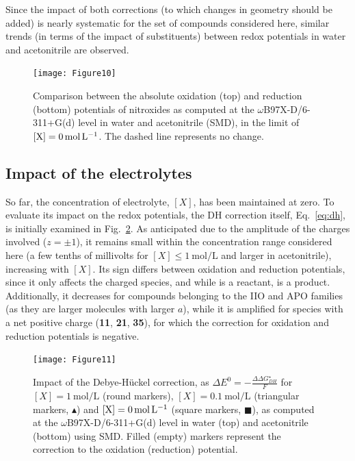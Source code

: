 \documentclass[review,preprint]{elsarticle}
\begin{document}
Since the impact of both corrections (to which changes in geometry should be added) is nearly systematic for the set of compounds considered here, similar trends (in terms of the impact of substituents) between redox potentials in water and acetonitrile are observed.



\begin{figure}[!h]
	\centering
	\texttt{[image: Figure10]}
	\caption{Comparison between the absolute oxidation (top) and reduction (bottom) potentials of nitroxides as computed at the $\omega$B97X-D/6-311+G(d) level in water and acetonitrile (SMD),  in the limit of $[\ce{X}]=\SI{0}{\mole\per\liter}$. The dashed line represents no change. }
	\label{fig:watvsac}
\end{figure}

\clearpage
\subsection{Impact of the electrolytes} \label{sec:elect}

So far, the concentration of electrolyte, $[X]$, has been maintained at zero. To evaluate its impact on the redox potentials, the DH correction itself, Eq.~\eqref{eq:dh}, is initially examined in Fig.~\ref{fig:DH}. As anticipated due to the amplitude of the charges involved ($z=\pm 1$), it remains small within the concentration range considered here (a few tenths of millivolts for $[X] \leq \SI{1}{\mole\per\liter}$ and larger in acetonitrile), increasing with $[X]$. Its sign differs between oxidation and reduction potentials, since it only affects the charged species, and while  is a reactant,  is a product. Additionally, it decreases for compounds belonging to the IIO and APO families (as they are larger molecules with larger $a$), while it is amplified for species with a net positive charge (\textbf{11}, \textbf{21}, \textbf{35}), for which the correction for oxidation and reduction potentials is negative.


\begin{figure}[!b]
	\centering
	\texttt{[image: Figure11]}
	\caption{Impact of the Debye-Hückel correction, as $\Delta E^0 = -\frac{\Delta \Delta G_{DH}^\star}{F}$ for $[X]=\SI{1}{\mole\per\liter}$ (round markers), $[X]=\SI{0.1}{\mole\per\liter}$ (triangular markers, $\blacktriangle$)  and $[\ce{X}]=\SI{0}{\mole\per\liter}$ (square markers, $\blacksquare$), as computed at the $\omega$B97X-D/6-311+G(d) level in water (top) and acetonitrile (bottom) using SMD. Filled (empty) markers represent the correction to the oxidation (reduction) potential. }
	\label{fig:DH}
\end{figure}
\end{document}
